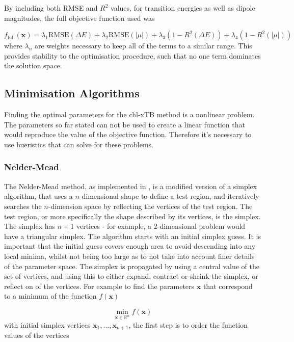 By including both RMSE and $R^2$ values, for transition energies as well as dipole
magnitudes, the full objective function used was

\begin{equation}
f_{\text{full}} \left( \mathbf{x} \right) = \lambda_1 \text{RMSE} \left(\Delta E \right)+ \lambda_2 \text{RMSE}\left( \left| \mu \right| \right) + \lambda_3 \left(1 - R^2 \left( \Delta E \right)\right) + \lambda_4 \left( 1 - R^2 \left( \left| \mu \right| \right)\right)
\end{equation}
%
where $\lambda_n$ are weights necessary to keep all of the terms to a similar range.
This provides stability to the optimisation procedure, such that no one term dominates
the solution space.

\subsection{Minimisation Algorithms}
\label{subsec:algorithms}
Finding the optimal parameters for the chl-xTB method is a nonlinear problem. The
parameters so far stated can not be used to create a linear function that would
reproduce the value of the objective function. Therefore it's necessary to use
hueristics that can solve for these problems.

\subsubsection{Nelder-Mead}
\label{nelder_mead}
The Nelder-Mead method, as implemented in , is a modified version of a simplex
algorithm, that uses a $n$-dimensional shape to define a test region, and iteratively
searches the $n$-dimension space by reflecting the vertices of the test region. 
The test region, or more specifically the shape described by its vertices, is the
simplex. The simplex has $n+1$ vertices - for example, a 2-dimensional problem
would have a triangular simplex.
The algorithm starts with an initial simplex guess. It is important that the initial
guess covers enough area to avoid descending into any local minima, whilst not being
too large as to not take into account finer details of the parameter space.
The simplex is propagated by using a central value of the set of vertices, and using
this to either expand, contract or shrink the simplex, or reflect on of the vertices.
For example to find the parameters $\mathbf{x}$ that correspond to a minimum of
the function $f\left(\mathbf{x}\right)$

\begin{equation}
\min_{\mathbf{x} \in \mathbb{R}^n} f\left( \mathbf{x} \right)
\end{equation}
%
with initial simplex vertices $\mathbf{x}_1, \dots, \mathbf{x}_{n+1}$, the first 
step is to order the function values of the vertices

